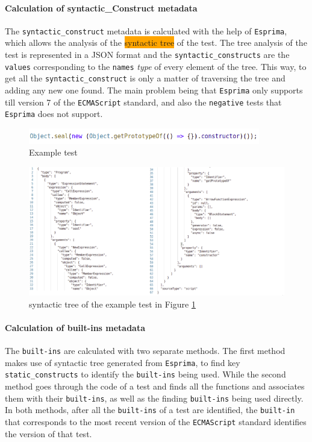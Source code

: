 \documentclass[runningheads]{llncs}
\begin{document}
\paragraph{Calculation of syntactic\_Construct metadata}
The \texttt{syntactic\_construct} metadata is calculated with the help of \texttt{Esprima}, which allows the analysis of the \colorbox{orange}{syntactic tree} of the test. The tree analysis of the test is represented in a JSON format and the \texttt{syntactic\_constructs} are the \texttt{values} corresponding to the \texttt{names} \emph{type} of every element of the tree. This way, to get all the \texttt{syntactic\_construct} is only a matter of traversing the tree and adding any new one found. The main problem being that \texttt{Esprima} only supports till version 7 of the \texttt{ECMAScript} standard, and also the \texttt{negative} tests that \texttt{Esprima} does not support.
\begin{figure}[ht]
    \centering
    \includegraphics[width=0.9\textwidth]{images/test_syntactic_tree.png}
    \caption{Example test}
    \label{fig:test_syntactic_tree}
\end{figure}
\begin{figure}[ht]
    \centering
    \includegraphics[width=1\textwidth]{images/JSON_syntactic_tree.png}
    \caption{syntactic tree of the example test in Figure \ref{fig:test_syntactic_tree}}
    \label{fig:JSON_syntactic_tree}
\end{figure}

\paragraph{Calculation of built-ins metadata}
The \texttt{built-ins} are calculated with two separate methods. The first method makes use of syntactic tree generated from \texttt{Esprima}, to find key \texttt{static\_constructs} to identify the \texttt{built-ins} being used. While the second method goes through the code of a test and finds all the functions and associates them with their \texttt{built-ins}, as well as the finding \texttt{built-ins} being used directly. In both methods, after all the \texttt{built-ins} of a test are identified, the \texttt{built-in} that corresponds to the most recent version of the \texttt{ECMAScript} standard identifies the version of that test. 
\end{document}
